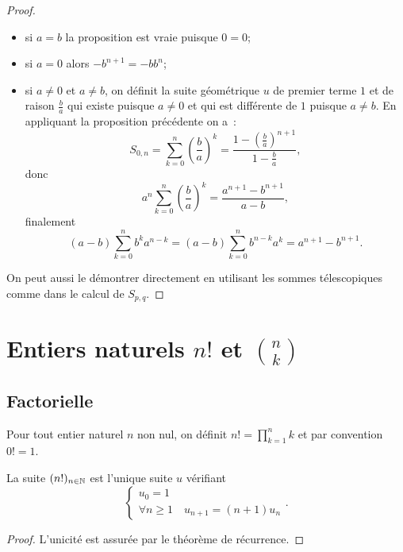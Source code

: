 \begin{proof}
  \begin{itemize}
  \item si \(a=b\) la proposition est vraie puisque \(0=0\);
  \item si \(a=0\) alors \(-b^{n+1}=-b b^n\);
  \item si \(a\neq 0\) et \(a\neq b\), on définit la suite géométrique \(u\) de premier terme \(1\) et de raison \(\frac{b}{a}\) qui existe puisque \(a\neq 0\) et qui est différente de \(1\) puisque \(a\neq b\). En appliquant la proposition précédente on a~: 
\begin{equation}
  S_{0,n}=\sum_{k=0}^n\left(\frac{b}{a}\right)^k=\frac{1-\left(\frac{b}{a}\right)^{n+1}}{1-\frac{b}{a}},
\end{equation}
donc
\begin{equation}
  a^n \sum_{k=0}^n\left(\frac{b}{a}\right)^k = \frac{a^{n+1}-b^{n+1}}{a-b},
\end{equation}
finalement
\begin{equation}
  (a-b)\sum_{k=0}^n b^ka^{n-k}=(a-b)\sum_{k=0}^n b^{n-k}a^{k}=a^{n+1}-b^{n+1}.
\end{equation}
\end{itemize}
On peut aussi le démontrer directement en utilisant les sommes télescopiques comme dans le calcul de \(S_{p,q}\).
\end{proof}

\section{Entiers naturels \(n!\) et \(\binom{n}{k}\)}

\subsection{Factorielle}

\begin{defdef}
  Pour tout entier naturel \(n\) non nul, on définit \(n!=\prod_{k=1}^n k\) et par convention \(0!=1\).
\end{defdef}
\begin{prop}
  La suite \((n!)_{n\in\mathbb{N}}\) est l'unique suite \(u\) vérifiant
  \begin{equation}
    \begin{cases}
      u_0=1 \\
      \forall n\geqslant 1 \quad u_{n+1}=(n+1) u_n
    \end{cases}.
  \end{equation}
\end{prop}
\begin{proof}
  L'unicité est assurée par le théorème de récurrence.
\end{proof}

